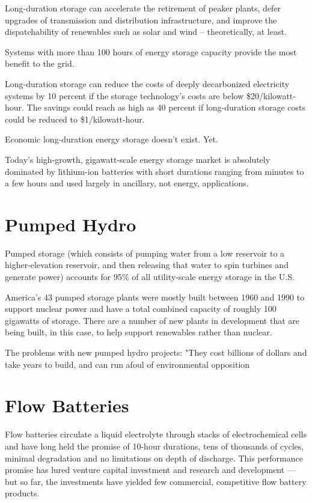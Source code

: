 \documentclass[
]{book}
\begin{document}
Long-duration storage can accelerate the retirement of peaker plants, defer upgrades of transmission and distribution infrastructure, and improve the dispatchability of renewables such as solar and wind -- theoretically, at least.

Systems with more than 100 hours of energy storage capacity provide the most benefit to the grid.

Long-duration storage can reduce the costs of deeply decarbonized electricity systems by 10 percent if the storage technology's costs are below \$20/kilowatt-hour. The savings could reach as high as 40 percent if long-duration storage costs could be reduced to \$1/kilowatt-hour.

Economic long-duration energy storage doesn't exist. Yet.

Today's high-growth, gigawatt-scale energy storage market is absolutely dominated by lithium-ion batteries with short durations ranging from minutes to a few hours and used largely in ancillary, not energy, applications.

\hypertarget{pumped-hydro}{%
\section{Pumped Hydro}\label{pumped-hydro}}

Pumped storage (which consists of pumping water from a low reservoir to a higher-elevation reservoir, and then releasing that water to spin turbines and generate power) accounts for 95\% of all utility-scale energy storage in the U.S.

America's 43 pumped storage plants were mostly built between 1960 and 1990 to support nuclear power and have a total combined capacity of roughly 100 gigawatts of storage. There are a number of new plants in development that are being built, in this case, to help support renewables rather than nuclear.

The problems with new pumped hydro projects: "They cost billions of dollars and take years to build, and can run afoul of environmental opposition

\hypertarget{flow-batteries-1}{%
\section{Flow Batteries}\label{flow-batteries-1}}

Flow batteries circulate a liquid electrolyte through stacks of electrochemical cells and have long held the promise of 10-hour durations, tens of thousands of cycles, minimal degradation and no limitations on depth of discharge. This performance promise has lured venture capital investment and research and development --- but so far, the investments have yielded few commercial, competitive flow battery products.
\end{document}
